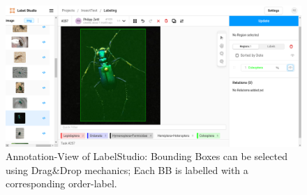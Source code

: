 \vfill
\begin{figure}[!ht]
    \centering
    \includegraphics[width=\textwidth]{images/LS-2.png}
    \caption{Annotation-View of LabelStudio: Bounding Boxes can be selected using Drag\&Drop mechanics; Each BB is labelled with a corresponding order-label.}
    \label{fig:label-studio-1}
\end{figure}
